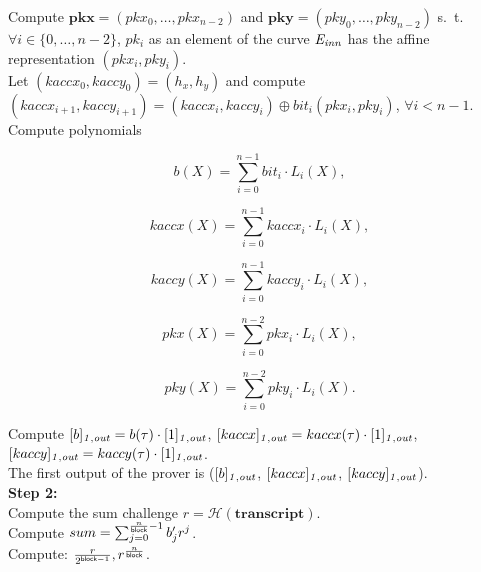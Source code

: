 \noindent Compute $\mathbf{pkx} = (\mathit{pkx_0}, \ldots, \mathit{pkx_{n-2}})$ and $\mathbf{pky} = (\mathit{pky_0}, \ldots, \mathit{pky_{n-2}})$ s.\ t.\  
$\forall i \in \{0, \ldots, n-2\}$, $\mathit{pk_i}$ as an element of the curve $\mathit{E}_{\mathit{inn}}$ has the affine representation $(\mathit{pkx_i}, \mathit{pky_i})$. \\

\noindent Let $(kaccx_{0}, kaccy_{0}) = (h_x, h_y)$ and 
compute $(kaccx_{i+1}, kaccy_{i+1}) =  (kaccx_{i}, kaccy_{i}) \oplus \mathit{bit_i}(pkx_{i}, pky_{i})$, $\forall i < n-1$. \\ 

\noindent Compute polynomials 

$$b(X) = \sum_{i=0}^{n-1} \mathit{bit_i} \cdot L_i(X),$$

$$kaccx(X) = \sum_{i=0}^{n-1} kaccx_i \cdot L_i(X),$$

$$kaccy(X) = \sum_{i=0}^{n-1} kaccy_i \cdot L_i(X),$$

$$pkx(X) = \sum_{i=0}^{n-2} pkx_i \cdot L_i(X),$$

$$pky(X) = \sum_{i=0}^{n-2} pky_i \cdot L_i(X).$$

\noindent Compute $[b]_{\mathit{1,out}} = b(\tau)\cdot[1]_{\mathit{1,out}}$, $[kaccx]_{\mathit{1,out}} = kaccx(\tau) \cdot [1]_{\mathit{1,out}}$, $[kaccy]_{\mathit{1,out}} = kaccy(\tau)\cdot [1]_{\mathit{1,out}}$. \\

\noindent The first output of the prover is ($[b]_{\mathit{1,out}}$, $[kaccx]_{\mathit{1,out}}$, $[kaccy]_{\mathit{1,out}}$). \\


\noindent \textbf{Step 2:} \\
\noindent Compute the sum challenge $r = \mathcal{H}(\mathbf{transcript})$. \\

\noindent Compute $sum = \sum_{j=0}^{\frac{n}{\mathsf{block}}-1} b'_{j} r^j$.\\

\noindent Compute: $\frac{r}{2^{\mathsf{block} -1}}, r^{\frac{n}{\mathsf{block}}}$. \\

